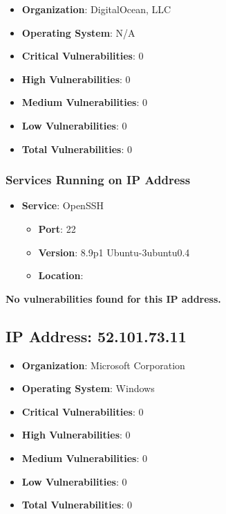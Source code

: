 \documentclass{article}
\begin{document}
\begin{itemize}
    \item \textbf{Organization}: DigitalOcean, LLC
    \item \textbf{Operating System}:  N/A 
    \item \textbf{Critical Vulnerabilities}: 0
    \item \textbf{High Vulnerabilities}: 0
    \item \textbf{Medium Vulnerabilities}: 0
    \item \textbf{Low Vulnerabilities}: 0
    \item \textbf{Total Vulnerabilities}: 0
\end{itemize}

\subsubsection*{Services Running on IP Address}

\begin{itemize}
    
        \item \textbf{Service}: OpenSSH
        \begin{itemize}
            \item \textbf{Port}: 22
            \item \textbf{Version}:  8.9p1 Ubuntu-3ubuntu0.4 
            \item \textbf{Location}: \href{  }{  }
        \end{itemize}
    
\end{itemize}


\textbf{No vulnerabilities found for this IP address.}




\clearpage



\subsection{IP Address: 52.101.73.11}

\begin{itemize}
    \item \textbf{Organization}: Microsoft Corporation
    \item \textbf{Operating System}:  Windows 
    \item \textbf{Critical Vulnerabilities}: 0
    \item \textbf{High Vulnerabilities}: 0
    \item \textbf{Medium Vulnerabilities}: 0
    \item \textbf{Low Vulnerabilities}: 0
    \item \textbf{Total Vulnerabilities}: 0
\end{itemize}
\end{document}
